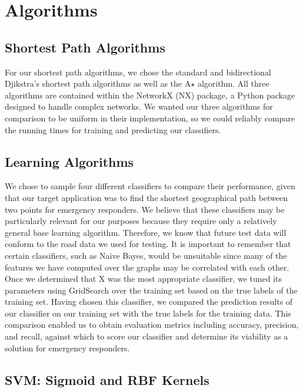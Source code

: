 \documentclass{article}
\begin{document}
\section{Algorithms}

\subsection{Shortest Path Algorithms}

For our shortest path algorithms, we chose the standard and bidirectional Djikstra's shortest path algorithms as well as the A$\star$ algorithm. All three algorithms are contained within the NetworkX (NX) package, a Python package designed to handle complex networks. We wanted our three algorithms for comparison to be uniform in their implementation, so we could reliably compare the running times for training and predicting our classifiers. 

\subsection{Learning Algorithms} 

We  chose to sample four different classifiers to compare their performance, given that our target application was to find the shortest geographical path between two points for emergency responders. We believe that these classifiers may be particularly relevant for our purposes because they require only a relatively general base learning algorithm. Therefore, we know that future test data will conform to the road data we used for testing. It is important to remember that certain classifiers, such as Naive Bayes, would be unsuitable since many of the features we have computed over the graphs may be correlated with each other. Once we determined that X was the most appropriate classifier, we tuned its parameters using GridSearch over the training set based on the true labels of the training set. Having chosen this classifier, we compared the prediction results of our classifier on our training set with the true labels for the training data. This comparison enabled us to obtain evaluation metrics including accuracy, precision, and recall, against which to score our classifier and determine its viability as a solution for emergency responders.

\subsection{SVM: Sigmoid and RBF Kernels}
\end{document}
